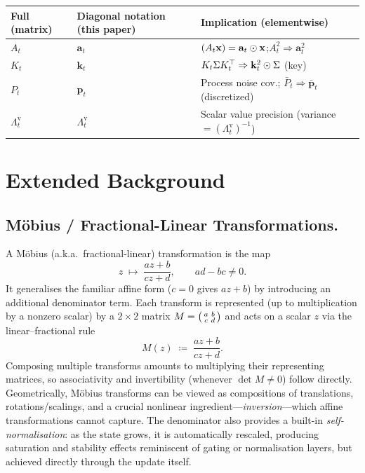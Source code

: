 \documentclass{article}
\begin{document}
\begin{center}
\small
\begin{tabular}{@{}lll@{}}
\toprule
\textbf{Full (matrix)} & \textbf{Diagonal notation (this paper)} & \textbf{Implication (elementwise)}\\
\midrule
$A_t$ & $\mathbf{a}_t$ & $(A_t \mathbf{x})=\mathbf{a}_t\odot \mathbf{x}$;\quad $A_t^2 \Rightarrow \mathbf{a}_t^{2}$ \\
$K_t$ & $\mathbf{k}_t$ & $K_t \Sigma K_t^\top \Rightarrow \mathbf{k}_t^{2}\odot \Sigma$ (key) \\
$P_t$ & $\mathbf{p}_t$ & Process noise cov.; $\bar P_t \Rightarrow \mathbf{\bar p}_t$ (discretized) \\
$\Lambda^{\mathrm{v}}_t$ & $\Lambda_t^{\mathrm{v}}$ & Scalar value precision (variance $= (\Lambda_t^{\mathrm{v}})^{-1}$) \\
\bottomrule
\end{tabular}
\end{center}

\section{Extended Background}
\label{app:ex-background}
\subsection{M\"{o}bius / Fractional-Linear Transformations.}
\label{sec:mobius}
A M\"{o}bius (a.k.a.\ fractional-linear) transformation is the map
\[
z \;\mapsto\; \frac{a z + b}{c z + d}, \qquad ad - bc \neq 0.
\]
It generalises the familiar affine form ($c=0$ gives $az+b$) by introducing an additional denominator term.
Each transform is represented (up to multiplication by a nonzero scalar) by a $2\times2$ matrix
$M=\begin{psmallmatrix}a & b \\ c & d\end{psmallmatrix}$ and acts on a scalar $z$ via the linear--fractional rule
\[
M(z) \;\coloneqq\; \frac{a z + b}{c z + d}.
\]
Composing multiple transforms amounts to multiplying their representing matrices, so associativity and invertibility (whenever $\det M\neq 0$) follow directly.
Geometrically, M\"{o}bius transforms can be viewed as compositions of translations, rotations/scalings, and a crucial nonlinear ingredient---\emph{inversion}---which affine transformations cannot capture.
The denominator also provides a built-in \emph{self-normalisation}: as the state grows, it is automatically rescaled, producing saturation and stability effects reminiscent of gating or normalisation layers, but achieved directly through the update itself.
\end{document}
